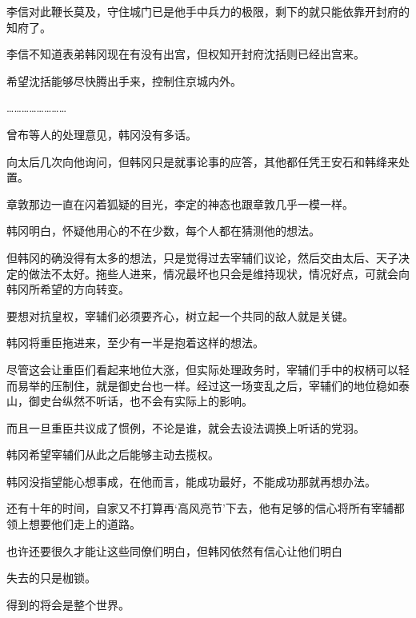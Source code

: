 李信对此鞭长莫及，守住城门已是他手中兵力的极限，剩下的就只能依靠开封府的知府了。

李信不知道表弟韩冈现在有没有出宫，但权知开封府沈括则已经出宫来。

希望沈括能够尽快腾出手来，控制住京城内外。

……………………

曾布等人的处理意见，韩冈没有多话。

向太后几次向他询问，但韩冈只是就事论事的应答，其他都任凭王安石和韩绛来处置。

章敦那边一直在闪着狐疑的目光，李定的神态也跟章敦几乎一模一样。

韩冈明白，怀疑他用心的不在少数，每个人都在猜测他的想法。

但韩冈的确没得有太多的想法，只是觉得过去宰辅们议论，然后交由太后、天子决定的做法不太好。拖些人进来，情况最坏也只会是维持现状，情况好点，可就会向韩冈所希望的方向转变。

要想对抗皇权，宰辅们必须要齐心，树立起一个共同的敌人就是关键。

韩冈将重臣拖进来，至少有一半是抱着这样的想法。

尽管这会让重臣们看起来地位大涨，但实际处理政务时，宰辅们手中的权柄可以轻而易举的压制住，就是御史台也一样。经过这一场变乱之后，宰辅们的地位稳如泰山，御史台纵然不听话，也不会有实际上的影响。

而且一旦重臣共议成了惯例，不论是谁，就会去设法调换上听话的党羽。

韩冈希望宰辅们从此之后能够主动去揽权。

韩冈没指望能心想事成，在他而言，能成功最好，不能成功那就再想办法。

还有十年的时间，自家又不打算再‘高风亮节’下去，他有足够的信心将所有宰辅都领上想要他们走上的道路。

也许还要很久才能让这些同僚们明白，但韩冈依然有信心让他们明白

失去的只是枷锁。

得到的将会是整个世界。

